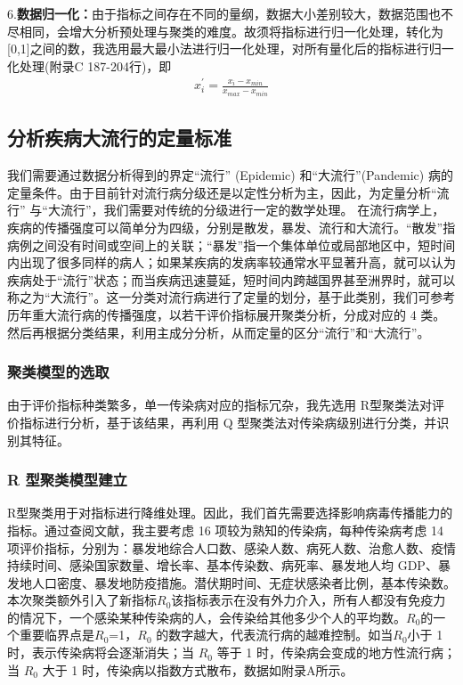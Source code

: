 \documentclass[a4paper, 11pt,twoside=true,UTF8]{scrartcl}
\begin{document}
6.\textbf{数据归一化：}由于指标之间存在不同的量纲，数据大小差别较大，数据范围也不尽相同，会增大分析预处理与聚类的难度。故须将指标进行归一化处理，转化为[0,1]之间的数，我选用最大最小法进行归一化处理，对所有量化后的指标进行归一化处理(附录C 187-204行)，即
$$
\begin{aligned}
x_i^{'}=\frac{x_i-x_{min}}{x_{max}-x_{min}}
\end{aligned}
$$
\subsection{分析疾病大流行的定量标准}
\qquad 我们需要通过数据分析得到的界定“流行” (Epidemic) 和“大流行”(Pandemic) 病的定量条件。由于目前针对流行病分级还是以定性分析为主，因此，为定量分析“流行” 与“大流行”，我们需要对传统的分级进行一定的数学处理。 在流行病学上，疾病的传播强度可以简单分为四级，分别是散发，暴发、流行和大流行。“散发”指病例之间没有时间或空间上的关联；“暴发”指一个集体单位或局部地区中，短时间内出现了很多同样的病人；如果某疾病的发病率较通常水平显著升高，就可以认为疾病处于“流行”状态；而当疾病迅速蔓延，短时间内跨越国界甚至洲界时，就可以称之为“大流行”。这一分类对流行病进行了定量的划分，基于此类别，我们可参考历年重大流行病的传播强度，以若干评价指标展开聚类分析，分成对应的 4 类。然后再根据分类结果，利用主成分分析，从而定量的区分“流行”和“大流行”。

\subsubsection{聚类模型的选取}
\qquad 由于评价指标种类繁多，单一传染病对应的指标冗杂，我先选用 R型聚类法对评价指标进行分析，基于该结果，再利用 Q 型聚类法对传染病级别进行分类，并识别其特征。

\subsubsection{R 型聚类模型建立}
\qquad R型聚类用于对指标进行降维处理。因此，我们首先需要选择影响病毒传播能力的指标。通过查阅文献，我主要考虑 16 项较为熟知的传染病，每种传染病考虑 14 项评价指标，分别为：暴发地综合人口数、感染人数、病死人数、治愈人数、疫情持续时间、感染国家数量、增长率、基本传染数、病死率、暴发地人均 GDP、暴发地人口密度、暴发地防疫措施。潜伏期时间、无症状感染者比例，基本传染数。本次聚类额外引入了新指标$R_0$该指标表示在没有外力介入，所有人都没有免疫力的情况下，一个感染某种传染病的人，会传染给其他多少个人的平均数。$R_0$的一个重要临界点是$R_0$=1，$R_0$ 的数字越大，代表流行病的越难控制。如当$R_0$小于 1 时，表示传染病将会逐渐消失；当 $R_0$ 等于 1 时，传染病会变成的地方性流行病；当 $R_0$ 大于 1 时，传染病以指数方式散布，数据如附录A所示。
\end{document}
